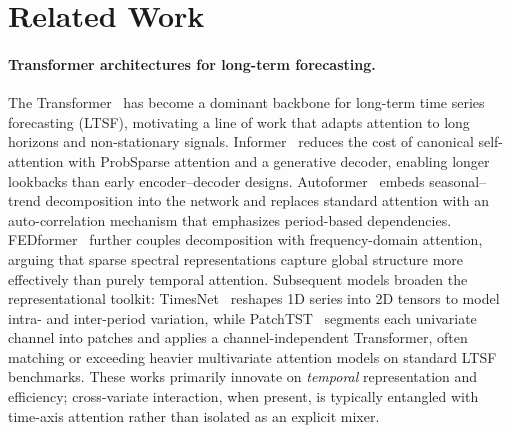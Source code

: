 \documentclass{article}
\begin{document}
\section{Related Work}
\label{sec:related}

\paragraph{Transformer architectures for long-term forecasting.}
The Transformer~\citep{vaswani2017attention} has become a dominant backbone for long-term time series forecasting (LTSF), motivating a line of work that adapts attention to long horizons and non-stationary signals.
Informer~\citep{zhou2021informer} reduces the cost of canonical self-attention with ProbSparse attention and a generative decoder, enabling longer lookbacks than early encoder--decoder designs.
Autoformer~\citep{wu2021autoformer} embeds seasonal--trend decomposition into the network and replaces standard attention with an auto-correlation mechanism that emphasizes period-based dependencies.
FEDformer~\citep{zhou2022fedformer} further couples decomposition with frequency-domain attention, arguing that sparse spectral representations capture global structure more effectively than purely temporal attention.
Subsequent models broaden the representational toolkit: TimesNet~\citep{wu2023timesnet} reshapes 1D series into 2D tensors to model intra- and inter-period variation, while PatchTST~\citep{nie2023patchtst} segments each univariate channel into patches and applies a channel-independent Transformer, often matching or exceeding heavier multivariate attention models on standard LTSF benchmarks.
These works primarily innovate on \emph{temporal} representation and efficiency; cross-variate interaction, when present, is typically entangled with time-axis attention rather than isolated as an explicit mixer.
\end{document}
